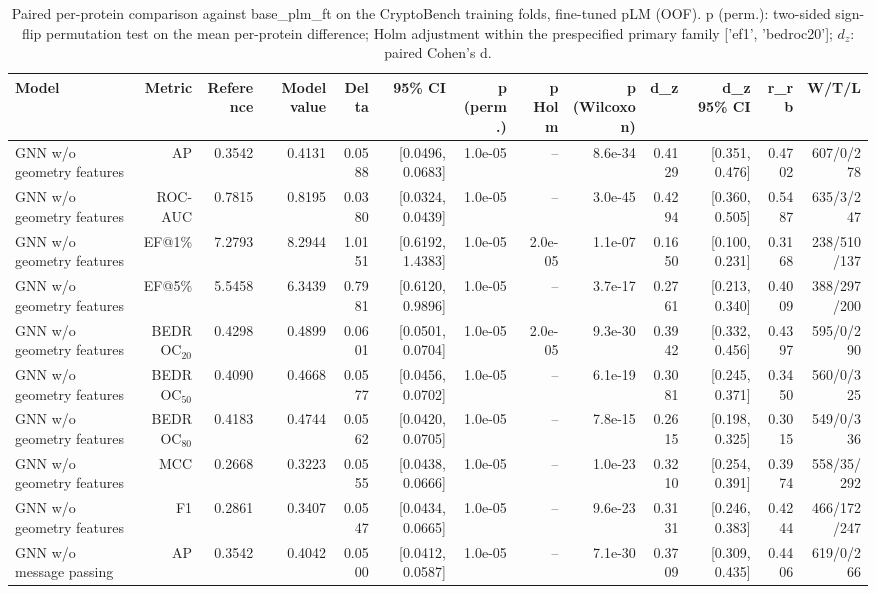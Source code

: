 \begin{table}[t]
\centering
\small
\caption{Paired per-protein comparison against base_plm_ft on the CryptoBench training folds, fine-tuned pLM (OOF). p (perm.): two-sided sign-flip permutation test on the mean per-protein difference; Holm adjustment within the prespecified primary family ['ef1', 'bedroc20']; $d_z$: paired Cohen's d.}
\label{tab:table_paired_vs_base_plm_ft}
\begin{tabular}{lrrrrrrrrrrrr}
\toprule
Model & Metric & Reference & Model value & Delta & 95\% CI & p (perm.) & p Holm & p (Wilcoxon) & d\_z & d\_z 95\% CI & r\_rb & W/T/L \\
\midrule
GNN w/o geometry features & AP & 0.3542 & 0.4131 & 0.0588 & [0.0496, 0.0683] & 1.0e-05 & -- & 8.6e-34 & 0.4129 & [0.351, 0.476] & 0.4702 & 607/0/278 \\
GNN w/o geometry features & ROC-AUC & 0.7815 & 0.8195 & 0.0380 & [0.0324, 0.0439] & 1.0e-05 & -- & 3.0e-45 & 0.4294 & [0.360, 0.505] & 0.5487 & 635/3/247 \\
GNN w/o geometry features & EF@1\% & 7.2793 & 8.2944 & 1.0151 & [0.6192, 1.4383] & 1.0e-05 & 2.0e-05 & 1.1e-07 & 0.1650 & [0.100, 0.231] & 0.3168 & 238/510/137 \\
GNN w/o geometry features & EF@5\% & 5.5458 & 6.3439 & 0.7981 & [0.6120, 0.9896] & 1.0e-05 & -- & 3.7e-17 & 0.2761 & [0.213, 0.340] & 0.4009 & 388/297/200 \\
GNN w/o geometry features & BEDROC$_{20}$ & 0.4298 & 0.4899 & 0.0601 & [0.0501, 0.0704] & 1.0e-05 & 2.0e-05 & 9.3e-30 & 0.3942 & [0.332, 0.456] & 0.4397 & 595/0/290 \\
GNN w/o geometry features & BEDROC$_{50}$ & 0.4090 & 0.4668 & 0.0577 & [0.0456, 0.0702] & 1.0e-05 & -- & 6.1e-19 & 0.3081 & [0.245, 0.371] & 0.3450 & 560/0/325 \\
GNN w/o geometry features & BEDROC$_{80}$ & 0.4183 & 0.4744 & 0.0562 & [0.0420, 0.0705] & 1.0e-05 & -- & 7.8e-15 & 0.2615 & [0.198, 0.325] & 0.3015 & 549/0/336 \\
GNN w/o geometry features & MCC & 0.2668 & 0.3223 & 0.0555 & [0.0438, 0.0666] & 1.0e-05 & -- & 1.0e-23 & 0.3210 & [0.254, 0.391] & 0.3974 & 558/35/292 \\
GNN w/o geometry features & F1 & 0.2861 & 0.3407 & 0.0547 & [0.0434, 0.0665] & 1.0e-05 & -- & 9.6e-23 & 0.3131 & [0.246, 0.383] & 0.4244 & 466/172/247 \\
GNN w/o message passing & AP & 0.3542 & 0.4042 & 0.0500 & [0.0412, 0.0587] & 1.0e-05 & -- & 7.1e-30 & 0.3709 & [0.309, 0.435] & 0.4406 & 619/0/266 \\

\end{tabular}
\end{table}
